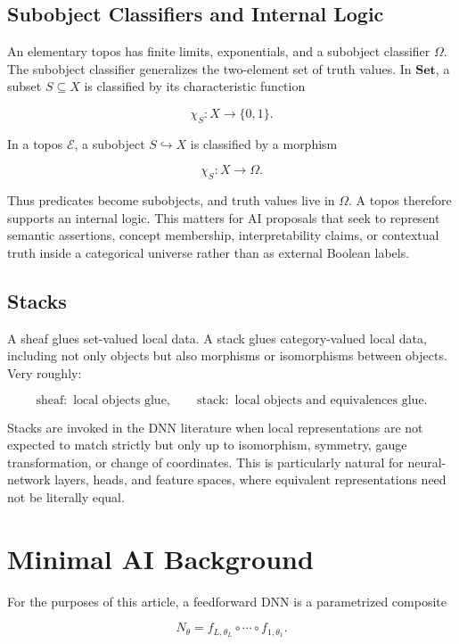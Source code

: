 \documentclass[11pt]{article}
\begin{document}
\subsection{Subobject Classifiers and Internal Logic}

An elementary topos has finite limits, exponentials, and a subobject classifier \(\Omega\). The subobject classifier generalizes the two-element set of truth values. In \(\mathbf{Set}\), a subset \(S\subseteq X\) is classified by its characteristic function


\[
\chi_S:X\to\{0,1\}.
\]

In a topos \(\mathcal{E}\), a subobject \(S\hookrightarrow X\) is classified by a morphism


\[
\chi_S:X\to\Omega.
\]

Thus predicates become subobjects, and truth values live in \(\Omega\). A topos therefore supports an internal logic. This matters for AI proposals that seek to represent semantic assertions, concept membership, interpretability claims, or contextual truth inside a categorical universe rather than as external Boolean labels.


\subsection{Stacks}

A sheaf glues set-valued local data. A stack glues category-valued local data, including not only objects but also morphisms or isomorphisms between objects. Very roughly:


\[
\text{sheaf}:\text{ local objects glue},
\qquad
\text{stack}:\text{ local objects and equivalences glue}.
\]

Stacks are invoked in the DNN literature when local representations are not expected to match strictly but only up to isomorphism, symmetry, gauge transformation, or change of coordinates. This is particularly natural for neural-network layers, heads, and feature spaces, where equivalent representations need not be literally equal.


\section{Minimal AI Background}

For the purposes of this article, a feedforward DNN is a parametrized composite


\[
N_\theta=f_{L,\theta_L}\circ\cdots\circ f_{1,\theta_1}.
\]
\end{document}

